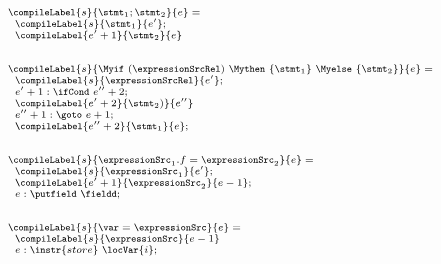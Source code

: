 \begin{figure}[ht!]
\begin{frameit}
$${\scriptsize 
        \begin{array}{l}
	      \compileLabel{s}{\stmt_1; \stmt_2}{e}  =  \\  
	      \begin{array}{l}
	            \compileLabel{s}{\stmt_1}{e'};\\
	    	    \compileLabel{e'+1}{\stmt_2}{e}
	      \end{array}  \\
       \\ \\
       \compileLabel{s}{ \Myif \ ( \expressionSrcRel ) \ \Mythen \ \{ \stmt_1 \} \  \Myelse \ \{ \stmt_2 \}   }{e}   =  \\  
        \begin{array}{l}
	    \compileLabel{s}{\expressionSrcRel}{e'}; \\
            e' + 1: \ifCond \ e'' + 2;\\
            \compileLabel{e' + 2}{\stmt_2)}{e''}\\
             e'' + 1: \goto \ e +  1; \\
            \compileLabel{e'' +  2}{\stmt_1}{ e  }; \\
	\end{array}  \\ 
	\\ \\  
	\compileLabel{s}{\expressionSrc_1.f= \expressionSrc_2}{e} = \\
             \begin{array}{l}
                        \compileLabel{s}{\expressionSrc_1}{e'};\\
			\compileLabel{e'+1}{\expressionSrc_2}{e - 1 };\\
			e  :\putfield \ \fieldd;
             \end{array} \\ 
	\\ \\  
	\compileLabel{s}{  \var = \expressionSrc }{e} =  \\  
             \begin{array}{l}
                        \compileLabel{s}{\expressionSrc}{e  - 1 }\\
			e : \instr{store} \ \locVar{i};
             \end{array} \\ 
	\\ \\  

\end{array}}$$
\end{frameit}
\end{figure}
